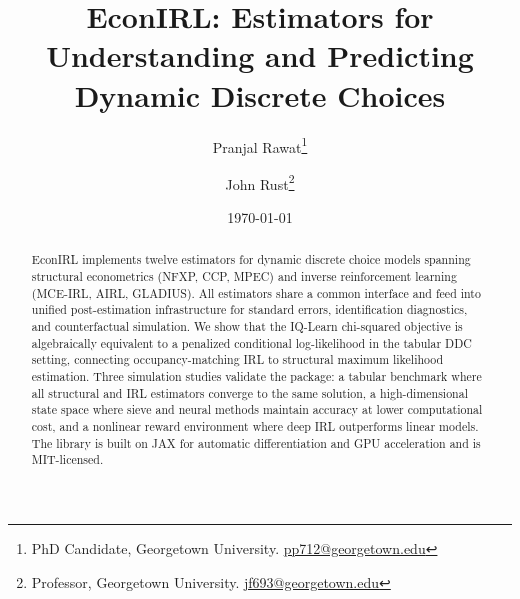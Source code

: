 \documentclass[11pt]{article}
\title{EconIRL: Estimators for Understanding and Predicting\\ Dynamic Discrete Choices}
\author{
  Pranjal Rawat\thanks{PhD Candidate, Georgetown University. \href{mailto:pp712@georgetown.edu}{pp712@georgetown.edu}}
  \and
  John Rust\thanks{Professor, Georgetown University. \href{mailto:jf693@georgetown.edu}{jf693@georgetown.edu}}
}
\date{\today}
\begin{document}
\maketitle

\begin{abstract}
\noindent
EconIRL implements twelve estimators for dynamic discrete choice models spanning structural econometrics (NFXP, CCP, MPEC) and inverse reinforcement learning (MCE-IRL, AIRL, GLADIUS).
All estimators share a common interface and feed into unified post-estimation infrastructure for standard errors, identification diagnostics, and counterfactual simulation.
We show that the IQ-Learn chi-squared objective is algebraically equivalent to a penalized conditional log-likelihood in the tabular DDC setting, connecting occupancy-matching IRL to structural maximum likelihood estimation.
Three simulation studies validate the package: a tabular benchmark where all structural and IRL estimators converge to the same solution, a high-dimensional state space where sieve and neural methods maintain accuracy at lower computational cost, and a nonlinear reward environment where deep IRL outperforms linear models.
The library is built on JAX for automatic differentiation and GPU acceleration and is MIT-licensed.
\end{abstract}

\bigskip












\appendix


\end{document}
